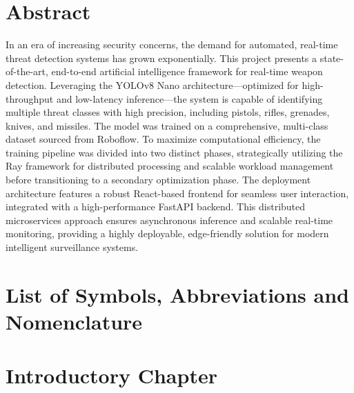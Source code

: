 \documentclass[12pt, a4paper]{report}
\begin{document}
\chapter*{Abstract}
In an era of increasing security concerns, the demand for automated, real-time threat detection systems has grown exponentially. This project presents a state-of-the-art, end-to-end artificial intelligence framework for real-time weapon detection. Leveraging the YOLOv8 Nano architecture—optimized for high-throughput and low-latency inference—the system is capable of identifying multiple threat classes with high precision, including pistols, rifles, grenades, knives, and missiles. The model was trained on a comprehensive, multi-class dataset sourced from Roboflow. To maximize computational efficiency, the training pipeline was divided into two distinct phases, strategically utilizing the Ray framework for distributed processing and scalable workload management before transitioning to a secondary optimization phase. The deployment architecture features a robust React-based frontend for seamless user interaction, integrated with a high-performance FastAPI backend. This distributed microservices approach ensures asynchronous inference and scalable real-time monitoring, providing a highly deployable, edge-friendly solution for modern intelligent surveillance systems.

\newpage
\tableofcontents

\newpage
\listoftables
{}

\newpage
\listoffigures
{}

\newpage
\chapter*{List of Symbols, Abbreviations and Nomenclature}


\newpage


\chapter{Introductory Chapter}
\end{document}

